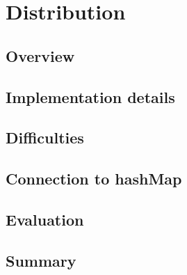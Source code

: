 
\chapter{Distribution}

\section{Overview}
\section{Implementation details}
\subsection{}
\subsection{}
\section{Difficulties}
\section{Connection to hashMap}
\section{Evaluation}
\section{Summary}
